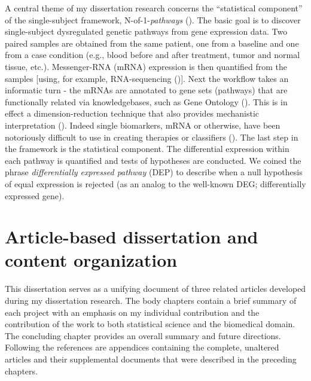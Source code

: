 \indent \indent A central theme of my dissertation research concerns the ``statistical component'' of the single-subject framework, N-of-1-\emph{pathways} (\cite{Gardeux2014}). The basic goal is to discover single-subject dysregulated genetic pathways from gene expression data. Two paired samples are obtained from the same patient, one from a baseline and one from a case condition (e.g., blood before and after treatment, tumor and normal tissue, etc.). Messenger-RNA (mRNA) expression is then quantified from the samples [using, for example, RNA-sequencing (\cite{Wang2009})]. Next the workflow takes an informatic turn - the mRNAs are annotated to gene sets (pathways) that are functionally related via knowledgebases, such as Gene Ontology (\cite{Ashburner2000}). This is in effect a dimension-reduction technique that also provides mechanistic interpretation (\cite{Mooney2015}). Indeed single biomarkers, mRNA or otherwise, have been notoriously difficult to use in creating therapies or classifiers (\cite{Kern2012}). The last step in the framework is the statistical component. The differential expression within each pathway is quantified and tests of hypotheses are conducted. We coined the phrase \emph{differentially expressed pathway} (DEP) to describe when a null hypothesis of equal expression is rejected (as an analog to the well-known DEG; differentially expressed gene). 

\section{Article-based dissertation and content organization}\label{sec:org}
\indent \indent This dissertation serves as a unifying document of three related articles developed during my dissertation research. The body chapters contain a brief summary of each project with an emphasis on my individual contribution and the contribution of the work to both statistical science and the biomedical domain. The concluding chapter provides an overall summary and future directions. Following the references are appendices containing the complete, unaltered articles and their supplemental documents that were described in the preceding chapters.

